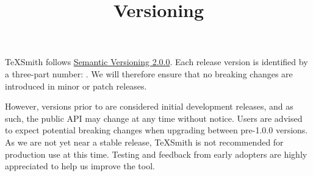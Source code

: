 \documentclass[a4paper,twoside]{article}
\title{Versioning}
\author{}\date{}
\begin{document}
\maketitle
TeXSmith follows \href{https://semver.org/spec/v2.0.0.html}{Semantic Versioning 2.0.0}. Each release version is identified by a three-part number: . We will therefore ensure that no breaking changes are introduced in minor or patch releases.

However, versions prior to  are considered initial development releases, and as such, the public API may change at any time without notice. Users are advised to expect potential breaking changes when upgrading between pre-1.0.0 versions. As we are not yet near a stable release, TeXSmith is not recommended for production use at this time. Testing and feedback from early adopters are highly appreciated to help us improve the tool.
\end{document}
